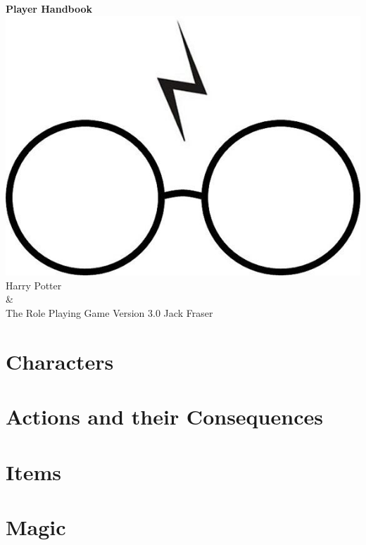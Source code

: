 \documentclass[oneside, twocolumn,9pt,english]{extbook}
\begin{document}
\begin{titlepage}
    \centering
    \vfill
    {\bfseries
        {\HP \fontsize{40}{35}\selectfont Player Handbook}
    }    
    \vfill
    \includegraphics[scale = 0.7]{../Images/glasses} %
    \vfill
    {\HP \fontsize{30}{24} \selectfont  Harry Potter \\\&\\ The Role Playing Game}
    \normalsize
    \vfill
    {\HP \fontsize{22}{0} \selectfont Version 3.0 \hfill Jack Fraser}
\end{titlepage}

\setcounter{tocdepth}{0}  
\begin{spacing}{0.8}
\footnotesize
\tableofcontents
\normalsize
\end{spacing}



\part{Characters} \label{C:CharacterCreation}


%



\part{Actions and their Consequences}







\part{Items}







\part{Magic}

\end{document}
